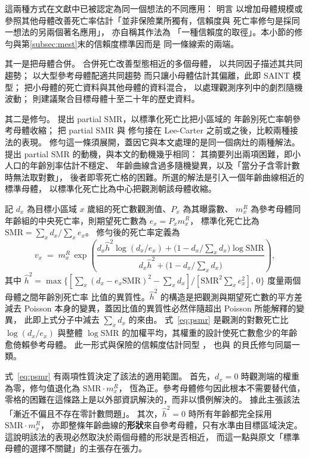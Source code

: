 \documentclass[UTF8, fontset=macnew, a4paper, 12pt]{ctexart}
\begin{document}
這兩種方式在文獻中已被認定為同一個想法的不同應用：\citet{wang2018} 明言
以增加母體規模或參照其他母體改善死亡率估計「並非保險業所獨有，信賴度與
死亡率修勻是採同一想法的另兩個著名應用」，\citet{ahcan2014} 亦自稱其作法為
「一種信賴度的取徑」。本小節的修勻與第\ref{subsec:mest}末的信賴度標準因而是
同一條線索的兩端。

其一是把母體合併。\citet{lilee2005} 合併死亡改善型態相近的多個母體，
以共同因子描述其共同趨勢；\citet{jarner2011} 以大型參考母體配適共同趨勢
而只讓小母體估計其偏離，此即 SAINT 模型；
\citet{ahcan2014} 把小母體的死亡資料與其他母體的資料混合，
以處理觀測序列中的劇烈隨機波動；
\citet{wang2018} 則建議聚合目標母體十至二十年的歷史資料。

其二是修勻。\citet{lee2003} 提出 partial SMR，以標準化死亡比把小區域的
年齡別死亡率朝參考母體收縮；\citet{yue2019} 把 partial SMR 與
\citet{whittaker1923} 修勻接在 Lee-Carter 之前或之後，比較兩種接法的表現。
修勻這一條須展開，蓋因它與本文處理的是同一個病灶的兩種解法。
\citet{lee2003} 提出 partial SMR 的動機，與本文的動機幾乎相同：
其摘要列出兩項困難，即小人口的年齡別率估計不穩定、
年齡曲線含過多隨機變異，以及「當分子含零計數時無法取對數」，
後者即零死亡格的困難。所選的解法是引入一個年齡曲線相近的標準母體，
以標準化死亡比為中心把觀測朝該母體收縮。

記 $d_x$ 為目標小區域 $x$ 歲組的死亡數觀測值、$P_x$ 為其曝露數、
$m^R_x$ 為參考母體同年齡組的中央死亡率，則期望死亡數為 $e_x=P_x m^R_x$，
標準化死亡比為 $\mathrm{SMR}=\sum_x d_x\big/\sum_x e_x$。
修勻後的死亡率定義為
\begin{equation}\label{eq:psmr}
v_x \;=\; m^R_x\,\exp\!\left(
\frac{d_x\hat h^2\log(d_x/e_x)+\bigl(1-d_x/\textstyle\sum_x d_x\bigr)\log \mathrm{SMR}}
     {d_x\hat h^2+\bigl(1-d_x/\textstyle\sum_x d_x\bigr)}\right),
\end{equation}
其中 $\hat h^2=\max\bigl\{[\sum_x(d_x-e_x\mathrm{SMR})^2-\sum_x d_x]
\big/[\mathrm{SMR}^2\sum_x e_x^2],\,0\bigr\}$ 度量兩個母體之間年齡別死亡率
比值的異質性。$\hat h^2$ 的構造是把觀測與期望死亡數的平方差減去 Poisson
本身的變異，蓋因比值的異質性必然伴隨超出 Poisson 所能解釋的變異，
此即上式分子中減去 $\sum_x d_x$ 的來由。
式~\eqref{eq:psmr} 是觀測的對數死亡比 $\log(d_x/e_x)$ 與整體
$\log\mathrm{SMR}$ 的加權平均，其權重的設計使死亡數愈少的年齡愈倚賴參考母體。
此一形式與保險的信賴度估計同型 \citep{klugman2012}，
也與 \citet{kimeldorf1967} 的貝氏修勻同屬一類。

式~\eqref{eq:psmr} 有兩項性質決定了該法的適用範圍。
首先，$d_x=0$ 時觀測端的權重為零，修勻值退化為 $\mathrm{SMR}\cdot m^R_x$，
恆為正。參考母體修勻因此根本不需要替代值，
零格的困難在這條路上是以外部資訊解決的，而非以慣例解決的。
\citet{lee2003} 據此主張該法「漸近不偏且不存在零計數問題」。
其次，$\hat h^2=0$ 時所有年齡都完全採用 $\mathrm{SMR}\cdot m^R_x$，
亦即整條年齡曲線的\textbf{形狀}來自參考母體，只有水準由目標區域決定。
這說明該法的表現必然取決於兩個母體的形狀是否相近，
而這一點與原文「標準母體的選擇不關鍵」的主張存在張力。
\end{document}
